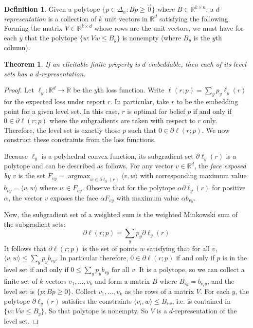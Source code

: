 \documentclass[12pt]{article}
\newtheorem{theorem}{Theorem}
\theoremstyle{definition}
\newtheorem{definition}{Definition}
\DeclareMathOperator*{\argmax}{\textrm{argmax}}
\newcommand{\reals}{\mathbb{R}}
\begin{document}
\begin{definition}
  Given a polytope $\{p \in \Delta_n : B p \geq \vec{0}\}$ where $B \in \reals^{k \times n}$, a \emph{$d$-representation} is a collection of $k$ unit vectors in $\reals^d$ satisfying the following.
  Forming the matrix $V \in \reals^{k \times d}$ whose rows are the unit vectors, we must have for each $y$ that the polytope $\{ w : Vw \leq B_y \}$ is nonempty (where $B_y$ is the $y$th column).
\end{definition}

\begin{theorem}
  If an elicitable finite property is $d$-embeddable, then each of its level sets has a $d$-representation.
\end{theorem}
\begin{proof}
  Let $\ell_y: \reals^d \to \reals$ be the $y$th loss function.
  Write $\ell(r;p) = \sum_y p_y \ell_y(r)$ for the expected loss under report $r$.
  In particular, take $r$ to be the embedding point for a given level set.
  In this case, $r$ is optimal for belief $p$ if and only if $0 \in \partial \ell(r;p)$ where the subgradients are taken with respect to $r$ only.
  Therefore, the level set is exactly those $p$ such that $0 \in \partial \ell(r;p)$.
  We now construct these constraints from the loss functions.

  Because $\ell_y$ is a polyhedral convex function, its subgradient set $\partial \ell_y(r)$ is a polytope and can be described as follows.
  For any vector $v \in \reals^d$, the \emph{face exposed by $v$} is the set $F_{vy} = \argmax_{w \in \partial \ell_y(r)} \langle v, w \rangle$ with corresponding maximum value $b_{vy} = \langle v, w \rangle$ where $w \in F_{vy}$.
  Observe that for the polytope $\alpha \partial \ell_y(r)$ for positive $\alpha$, the vector $v$ exposes the face $\alpha F_{vy}$ with maximum value $\alpha b_{vy}$.

  Now, the subgradient set of a weighted sum is the weighted Minkowski sum of the subgradient sets:
    \[ \partial \ell(r;p) = \sum_y p_y \partial \ell_y(r) \]
  It follows that $\partial \ell(r;p)$ is the set of points $w$ satisfying that for all $v$, $\langle v,w \rangle \leq \sum_y p_y b_{vy}$.
  In particular therefore, $0 \in \partial \ell(r;p)$ if and only if $p$ is in the level set if and only if $0 \leq \sum_y p_y b_{vy}$ for all $v$.
  It is a polytope, so we can collect a finite set of $k$ vectors $v_1,\dots,v_k$ and form a matrix $B$ where $B_{iy} = b_{v_iy}$, and the level set is $\{p : B p \geq 0 \}$.
  Collect $v_1,\dots,v_k$ as the rows of a matrix $V$.
  For each $y$, the polytope $\partial \ell_y(r)$ satisfies the constraints $\langle v_i,w\rangle \leq B_{iw}$, i.e. is contained in $\{ w : Vw \leq B_y\}$.
  So that polytope is nonempty.
  So $V$ is a $d$-representation of the level set.
\end{proof}
\end{document}
